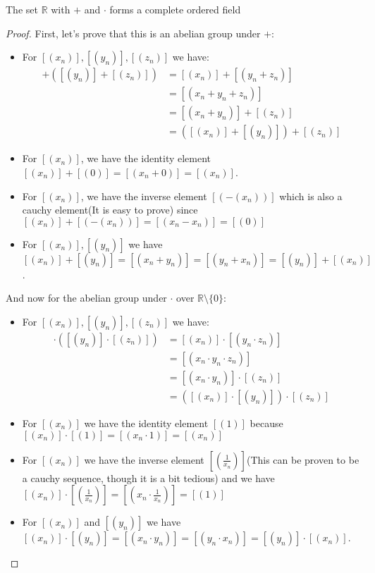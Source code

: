 \documentclass{tufte-handout}
\begin{document}
\begin{theorem}
	The set $\mathbb{R}$ with $+$ and $\cdot$ forms a complete ordered field
\end{theorem}
\begin{proof}
	First, let's prove that this is an abelian group under $+$:
	\begin{itemize}
		\item For $[(x_n)], [(y_n)], [(z_n)]$ we have:
		\begin{align*}
			[(x_n)] + ([(y_n)] + [(z_n)]) &= [(x_n)] + [(y_n + z_n)]\\
			&= [(x_n + y_n + z_n)]\\
			&= [(x_n + y_n)] + [(z_n)]\\
			&= ([(x_n)] + [(y_n)]) + [(z_n)]
		\end{align*}
		\item For $[(x_n)]$, we have the identity element $[(x_n)] + [(0)] = [(x_n + 0)] = [(x_n)]$.
		\item For $[(x_n)]$, we have the inverse element $[(-(x_n))]$ which is also a cauchy element(It is easy to prove) since $[(x_n)] + [(-(x_n))] = [(x_n - x_n)] = [(0)]$
		\item For $[(x_n)], [(y_n)]$ we have $[(x_n)] + [(y_n)] = [(x_n + y_n)] = [(y_n + x_n)] = [(y_n)] + [(x_n)]$.
	\end{itemize}

	And now for the abelian group under $\cdot$ over $\mathbb{R} \setminus \{0\}$:
	\begin{itemize}
		\item For $[(x_n)], [(y_n)], [(z_n)]$ we have:
		\begin{align*}
			[(x_n)] \cdot ([(y_n)] \cdot [(z_n)]) &= [(x_n)] \cdot [(y_n \cdot z_n)]\\
			&= [(x_n \cdot y_n \cdot z_n)]\\
			&= [(x_n \cdot y_n)] \cdot [(z_n)]\\
			&= ([(x_n)] \cdot [(y_n)]) \cdot [(z_n)]
		\end{align*}
		\item For $[(x_n)]$ we have the identity element $[(1)]$ because $[(x_n)] \cdot [(1)] = [(x_n \cdot 1)] = [(x_n)]$
		\item For $[(x_n)]$ we have the inverse element $\left[\left(\frac{1}{x_n}\right)\right]$(This can be proven to be a cauchy sequence, though it is a bit tedious) and we have $[(x_n)] \cdot \left[\left(\frac{1}{x_n}\right)\right] = \left[\left(x_n \cdot \frac{1}{x_n}\right)\right] = [(1)]$
		\item For $[(x_n)]$ and $[(y_n)]$ we have $[(x_n)] \cdot [(y_n)] = [(x_n \cdot y_n)] = [(y_n \cdot x_n)] = [(y_n)] \cdot [(x_n)]$.
	\end{itemize}


\end{proof}
\end{document}
